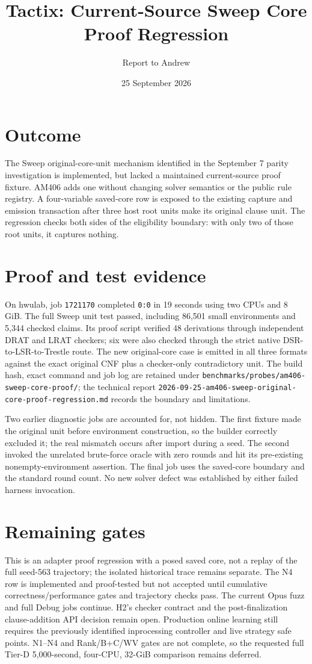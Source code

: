 \documentclass[11pt]{article}
\title{Tactix: Current-Source Sweep Core Proof Regression}
\author{Report to Andrew}
\date{25 September 2026}
\begin{document}
\maketitle
\vspace{-1.5em}

\section*{Outcome}
The Sweep original-core-unit mechanism identified in the September 7 parity
investigation is implemented, but lacked a maintained current-source proof
fixture. AM406 adds one without changing solver semantics or the public rule
registry. A four-variable saved-core row is exposed to the existing capture
and emission transaction after three host root units make its original clause
unit. The regression checks both sides of the eligibility boundary: with only
two of those root units, it captures nothing.

\section*{Proof and test evidence}
On hwulab, job \texttt{1721170} completed \texttt{0:0} in 19 seconds using two
CPUs and 8 GiB. The full Sweep unit test passed, including 86,501 small
environments and 5,344 checked claims. Its proof script verified 48
derivations through independent DRAT and LRAT checkers; six were also checked
through the strict native DSR-to-LSR-to-Trestle route. The new original-core
case is emitted in all three formats against the exact original CNF plus a
checker-only contradictory unit. The build hash, exact command and job log
are retained under \texttt{benchmarks/probes/am406-sweep-core-proof/}; the
technical report \texttt{2026-09-25-am406-sweep-original-core-proof-regression.md}
records the boundary and limitations.

Two earlier diagnostic jobs are accounted for, not hidden. The first fixture
made the original unit before environment construction, so the builder
correctly excluded it; the real mismatch occurs after import during a seed.
The second invoked the unrelated brute-force oracle with zero rounds and hit
its pre-existing nonempty-environment assertion. The final job uses the
saved-core boundary and the standard round count. No new solver defect was
established by either failed harness invocation.

\section*{Remaining gates}
This is an adapter proof regression with a posed saved core, not a replay of
the full seed-563 trajectory; the isolated historical trace remains separate.
The N4 row is implemented and proof-tested but not accepted until cumulative
correctness/performance gates and trajectory checks pass. The current Opus
fuzz and full Debug jobs continue. H2's checker contract and the
post-finalization clause-addition API decision remain open. Production online
learning still requires the previously identified inprocessing controller
and live strategy safe points. N1--N4 and Rank/B+C/WV gates are not complete,
so the requested full Tier-D 5,000-second, four-CPU, 32-GiB comparison remains
deferred.
\end{document}
